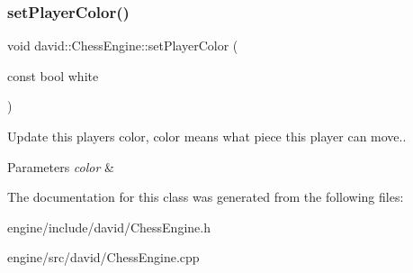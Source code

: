 \subsubsection{\texorpdfstring{set\+Player\+Color()}{setPlayerColor()}}
{\footnotesize\ttfamily void david\+::\+Chess\+Engine\+::set\+Player\+Color (\begin{DoxyParamCaption}\item[{const bool}]{white }\end{DoxyParamCaption})}

Update this players color, color means what piece this player can move..


\begin{DoxyParams}{Parameters}
{\em color} & \\
\hline
\end{DoxyParams}


The documentation for this class was generated from the following files\+:\begin{DoxyCompactItemize}
\item 
engine/include/david/Chess\+Engine.\+h\item 
engine/src/david/Chess\+Engine.\+cpp\end{DoxyCompactItemize}
